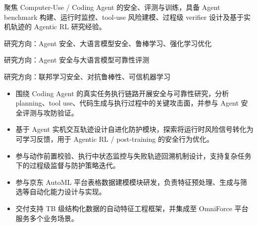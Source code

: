 
\vspace{0.3em}
聚焦 Computer-Use / Coding Agent 的安全、评测与训练，具备 Agent benchmark 构建、运行时监控、tool-use 风险建模、过程级 verifier 设计及基于实机轨迹的 Agentic RL 研究经验。



研究方向：Agent 安全、大语言模型安全、鲁棒学习、强化学习优化

研究方向：Agent 安全与大语言模型可靠性评测

研究方向：联邦学习安全、对抗鲁棒性、可信机器学习



\begin{itemize}[leftmargin=1.5em]
  \item 围绕 Coding Agent 的真实任务执行链路开展安全与可靠性研究，分析 planning、tool use、代码生成与执行过程中的关键攻击面，并参与 Agent 安全评测与攻防验证。
  \item 基于 Agent 实机交互轨迹设计自进化防护模块，探索将运行时风险信号转化为可学习反馈，用于 Agentic RL / post-training 的安全行为优化。
  \item 参与动作前置校验、执行中状态监控与失败轨迹回溯机制设计，支持复杂任务下的过程级监督与防护策略迭代。
\end{itemize}

\begin{itemize}[leftmargin=1.5em]
  \item 参与京东 AutoML 平台表格数据建模模块研发，负责特征预处理、生成与筛选等自动化能力设计与实现。
  \item 交付支持 TB 级结构化数据的自动特征工程框架，并集成至 OmniForce 平台服务多个业务场景。
\end{itemize}

